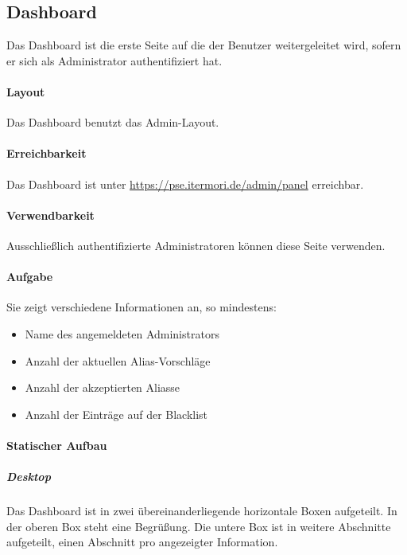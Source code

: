 \subsection{Dashboard}

Das Dashboard ist die erste Seite auf die der Benutzer weitergeleitet wird, sofern er sich als Administrator authentifiziert hat.

\paragraph*{Layout}
Das Dashboard benutzt das Admin-Layout.

\paragraph*{Erreichbarkeit}
Das Dashboard ist unter \href{https://pse.itermori.de/admin/panel}{https://pse.itermori.de/admin/panel} erreichbar.

\paragraph*{Verwendbarkeit}
Ausschließlich authentifizierte Administratoren können diese Seite verwenden.

\paragraph*{Aufgabe}
Sie zeigt verschiedene Informationen an, so mindestens:

\begin{itemize}
    \item Name des angemeldeten Administrators
    \item Anzahl der aktuellen Alias-Vorschläge
    \item Anzahl der akzeptierten Aliasse
    \item Anzahl der Einträge auf der Blacklist
\end{itemize}

\paragraph*{Statischer Aufbau}
\subparagraph*{Desktop}
Das Dashboard ist in zwei übereinanderliegende horizontale Boxen aufgeteilt.
In der oberen Box steht eine Begrüßung.
Die untere Box ist in weitere Abschnitte aufgeteilt, einen Abschnitt pro angezeigter Information.

\begin{center}
    \captionsetup[figure]{labelformat=empty}
    \captionsetup[figure]{labelformat=default}
\end{center}


